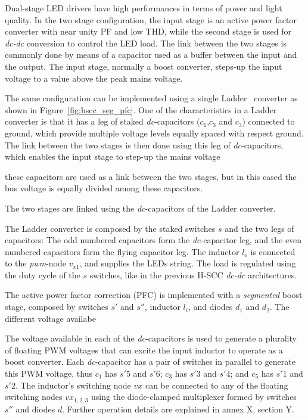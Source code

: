 Dual-stage LED drivers have high performances in terms of power and light quality. In the two stage configuration, the input stage is an active power factor  converter with near unity PF and low THD, while the second stage is used for \emph{dc-dc} conversion to control the LED load. The link between the two stages is commonly done by means of a capacitor used as a buffer between the input and the output. The input stage, normally a boost converter, steps-up the input voltage to a value above the peak mains voltage.

The same configuration can be implemented using a single Ladder~\cite{segPFC} converter as shown in Figure~\ref{fig:hscc_seg_pfc}. One of the characteristics in a Ladder converter is that it has a leg of staked \emph{dc}-capacitors ($c_1$,$c_3$ and $c_3$) connected to ground, which provide multiple voltage levels equally spaced with respect ground. The link between the two stages is then done using this leg of \emph{dc}-capacitors, which enables the input stage to step-up the mains voltage

 these capacitors are used as a link between the two stages, but in this cased the bus voltage is equally divided among these capacitors.



 The two stages are linked using the \emph{dc}-capacitors of the Ladder converter.



The Ladder converter is composed by the staked switches $s$ and the two legs of capacitors: The odd numbered capacitors form the \emph{dc}-capacitor leg, and the even numbered capacitors form the flying capacitor leg. The inductor $l_o$ is connected to the \emph{pwm}-node $v_{x1}$, and supplies the LEDs string.  The load is regulated using the duty cycle of the $s$ switches, like in the previous H-SCC \emph{dc-dc} architectures.

The active power factor correction (PFC) is implemented with a \emph{segmented} boost stage, composed by switches $s'$ and $s''$, inductor $l_i$, and diodes $d_1$ and $d_2$. The different voltage availabe


The voltage available in each of the \emph{dc}-capacitors is used to generate a plurality of floating PWM voltages that can excite the input inductor to operate as a boost converter.  Each \emph{dc}-capacitor has a pair of switches in parallel to generate this PWM voltage, thus $c_1$ has $s'5$ and $s'6$; $c_3$ has $s'3$ and $s'4$; and $c_5$ has $s'1$ and $s'2$. The inductor's switching node $vx$ can be connected to any of the floating switching nodes $vx_{1,2,3}$ using the diode-clamped multiplexer formed by switches $s''$ and diodes $d$. Further operation details are explained in annex X, section Y.\\


